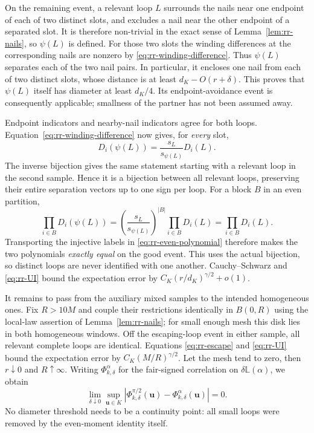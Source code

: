 On the remaining event, a relevant loop $L$ surrounds the nails
near one endpoint of each of two distinct slots, and excludes a
nail near the other endpoint of a separated slot.  It is therefore
non-trivial in the exact sense of Lemma~\ref{lem:rr-nails}, so
$\psi(L)$ is defined.  For those two slots the winding differences
at the corresponding nails are nonzero by
\eqref{eq:rr-winding-difference}.  Thus $\psi(L)$ separates each
of the two nail pairs.  In particular, it encloses one nail from
each of two distinct slots, whose distance is at least
$d_K-O(r+\delta)$.  This proves that $\psi(L)$ itself has diameter
at least $d_K/4$.  Its endpoint-avoidance event is consequently
applicable; smallness of the partner has not been assumed away.

Endpoint indicators and nearby-nail indicators agree for both
loops.  Equation~\eqref{eq:rr-winding-difference} now gives,
for \emph{every} slot,
\begin{equation}
 D_i(\psi(L))=\frac{s_L}{s_{\psi(L)}}D_i(L).
 \label{eq:rr-signature}
\end{equation}
The inverse bijection gives the same statement starting with a
relevant loop in the second sample.  Hence it is a bijection
between all relevant loops, preserving their entire separation
vectors up to one sign per loop.  For a block $B$ in an even
partition,
\[
 \prod_{i\in B}D_i(\psi(L))
    =\left(\frac{s_L}{s_{\psi(L)}}\right)^{|B|}
                       \prod_{i\in B}D_i(L)
    =\prod_{i\in B}D_i(L).
\]
Transporting the injective labels in
\eqref{eq:rr-even-polynomial} therefore makes the two polynomials
\emph{exactly equal} on the good event.  This uses the actual
bijection, so distinct loops are never identified with one another.
Cauchy--Schwarz and \eqref{eq:rr-UI} bound the expectation error by
$C_K(r/d_K)^{\gamma/2}+o(1)$.

It remains to pass from the auxiliary mixed samples to the intended
homogeneous ones.  Fix $R>10M$ and couple their restrictions
identically in $B(0,R)$ using the local-law assertion of
Lemma~\ref{lem:rr-nails}; for small enough mesh this disk lies in
both homogeneous windows.  Off the escaping-loop event in either
sample, all relevant complete loops are identical.  Equations
\eqref{eq:rr-escape} and \eqref{eq:rr-UI} bound the expectation
error by $C_K(M/R)^{\gamma/2}$.  Let the mesh tend to zero,
then $r\downarrow0$ and $R\uparrow\infty$.  Writing
$\Phi^{\alpha}_{k,\delta}$ for the fair-signed correlation on
$\delta\mathbb L(\alpha)$, we obtain
\begin{equation}
 \lim_{\delta\downarrow0}\sup_{\boldsymbol u\in K}
 \left|\Phi^{\pi/2}_{k,\delta}(\boldsymbol u)
                   -\Phi^{\alpha}_{k,\delta}(\boldsymbol u)\right|=0.
 \label{eq:rr-isoradial-transfer}
\end{equation}
No diameter threshold needs to be a continuity point: all small
loops were removed by the even-moment identity itself.

